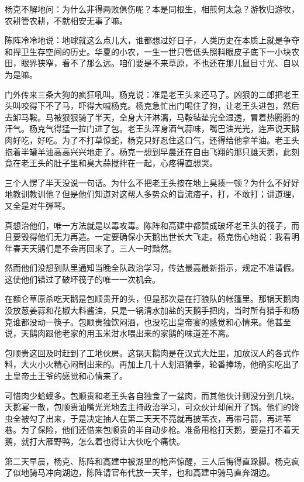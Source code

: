 \par 杨克不解地问：为什么非得两败俱伤呢？本是同根生，相煎何太急？游牧归游牧，农耕管农耕，不就相安无事了嘛。
\par 陈阵冷冷地说：地球就这么点儿大，谁都想过好日子，人类历史在本质上就是争夺和捍卫生存空间的历史。华夏的小农，一生一世只管低头照料眼皮子底下一小块农田，眼界狭窄，看不了那么远。咱们要是不来草原，不也还在那儿鼠目寸光、自以为是嘛。
\par 门外传来三条大狗的疯狂吼叫。杨克说：准是老王头来还马了。凶狠的二郎把老王头叫咬得下不了马，吓得大喊杨克。杨克急忙出门喝住了狗，让老王头进包，然后去卸马鞍。马被狠狠骑了半天，全身大汗淋漓，马鞍毡垫完全湿透，冒着热腾腾的汗气。杨克气得猛一拉门进了包。老王头浑身酒气蒜味，嘴巴油光光，连声说天鹅肉好吃，好吃。为了不打草惊蛇，杨克只好忍住这口气，还得给他拿羊油。老王头抱着半罐羊油高高兴兴地走了。杨克一想到早晨还在自由飞翔的那只雄天鹅，此刻竟在老王头的肚子里和臭大蒜搅拌在一起，心疼得直想哭。
\par 三个人愣了半天没说一句话。为什么不把老王头按在地上臭揍一顿？为什么不好好地教训教训他？但是他们知道对这帮人多势众的盲流痞子，打，不敢打；讲道理，又全是对牛弹琴。
\par 真想治他们，唯一方法就是以毒攻毒。陈阵和高建中都赞成破坏老王头的筏子，而且要毁得他们无力再造。一定要确保小天鹅出世长大飞走。杨克伤心地说：我看明年春天天鹅们是不会再回来了。三人一时黯然。
\par 然而他们没想到队里通知当晚全队政治学习，传达最高最新指示，规定不准请假。这使他们错过了破坏筏子的唯一一次机会。
\par 在额仑草原杀吃天鹅是包顺贵开的头，但是那次是在打狼队的帐篷里。那锅天鹅肉没放葱姜蒜和花椒大料酱油，只是一锅清水加盐的天鹅手把肉，当时所有猎手和杨克谁都没动一筷子。包顺贵独饮闷酒，也没吃出皇帝宴的感觉和心情来。他甚至说，天鹅肉跟他老家的用玉米泔水喂出来的家鹅的味道差不离。
\par 包顺贵这回及时赶到了工地伙房。这锅天鹅肉是在汉式大灶里，加放汉人的各式作料，大火小火精心闷制出来的。再加上几十人划酒猜拳，轮番捧场，他确实吃出了土皇帝土王爷的感觉和心情来了。
\par 可惜肉少蛤蟆多。包顺贵和老王头各自独食了一盆肉，而其他伙计则没分到几块。天鹅宴一散，包顺贵油嘴光光地去主持政治学习，可众伙计却闹开了锅。他们的馋虫全被勾了出来，于是决定抽人在第二天天不亮就再披苇衣，再带弓箭，再进苇巷。为了保险，他们还借来包顺贵的半自动步枪。准备用枪打天鹅，要是打不着天鹅，就打大雁野鸭，怎么着也得让大伙吃个痛快。
\par 
\par 第二天早晨，杨克、陈阵和高建中被湖里的枪声惊醒，三人后悔得直跺脚。杨克疯了似地骑马冲向湖边，陈阵请官布代放一天羊，也和高建中骑马直奔湖边。
